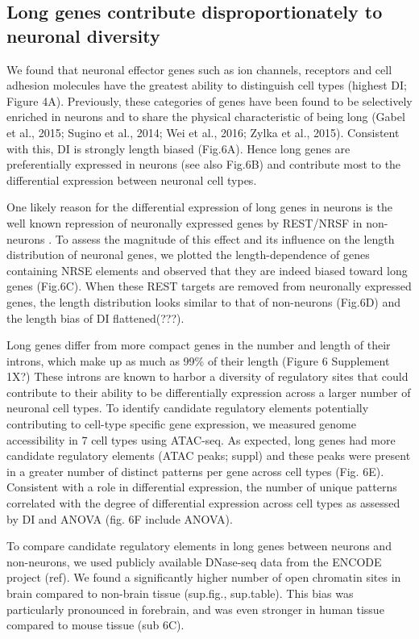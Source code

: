 \subsection{Long genes contribute disproportionately to neuronal diversity}

We found that neuronal effector genes such as ion channels, receptors and cell adhesion molecules have the greatest ability to distinguish cell types (highest DI; Figure 4A). Previously, these categories of genes have been found to be selectively enriched in neurons and to share the physical characteristic of being long (Gabel et al., 2015; Sugino et al., 2014; Wei et al., 2016; Zylka et al., 2015). Consistent with this, DI is strongly length biased (Fig.6A). Hence long genes are preferentially expressed in neurons (see also Fig.6B) and contribute most to the differential expression between neuronal cell types. 

One likely reason for the differential expression of long genes in neurons is the well known repression of neuronally expressed genes by REST/NRSF in non-neurons . To assess the magnitude of this effect and its influence on the length distribution of neuronal genes, we plotted the length-dependence of genes containing NRSE elements and observed that they are indeed biased toward long genes (Fig.6C). When these REST targets are removed from neuronally expressed genes, the length distribution looks similar to that of non-neurons (Fig.6D) and the length bias of DI flattened(???).

Long genes differ from more compact genes in the number and length of their introns, which make up as much as 99\% of their length (Figure 6 Supplement 1X?) These introns are known to harbor a diversity of regulatory sites that could contribute to their ability to be differentially expression across a larger number of neuronal cell types. To identify candidate regulatory elements potentially contributing to cell-type specific gene expression, we measured genome accessibility in 7 cell types using ATAC-seq. As expected, long genes had more candidate regulatory elements (ATAC peaks; suppl) and these peaks were present in a greater number of distinct patterns per gene across cell types (Fig. 6E). Consistent with a role in differential expression, the number of unique patterns correlated with the degree of differential expression across cell types as assessed by DI and ANOVA (fig. 6F include ANOVA).

To compare candidate regulatory elements in long genes between neurons and non-neurons, we used publicly available DNase-seq data from the ENCODE project (ref). We found a significantly higher number of open chromatin sites in brain compared to non-brain tissue (sup.fig., sup.table). This bias was  particularly pronounced in forebrain, and was even stronger in human tissue compared to mouse tissue (sub 6C).